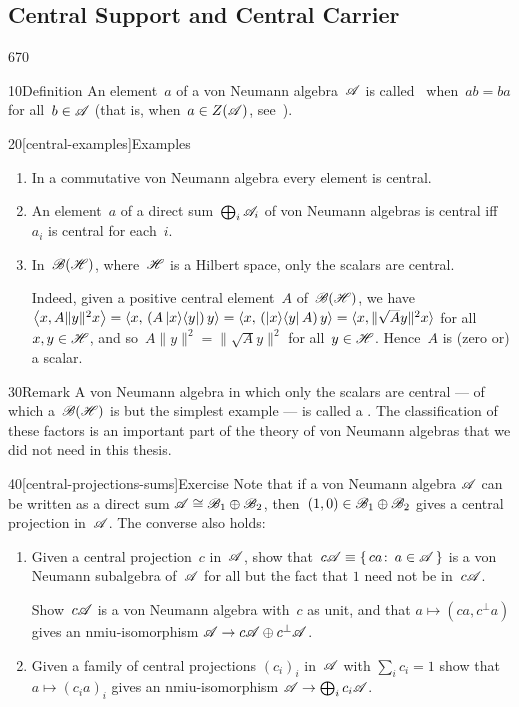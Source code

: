 \subsection{Central Support and Central Carrier}
\begin{parsec}{670}%
\begin{point}{10}{Definition}%
An element~$a$ of a von Neumann algebra~$\mathscr{A}$
is called~%
when~$ab=ba$ for all~$b\in\mathscr{A}$
(that is, when~$a\in Z(\mathscr{A})$, see~).
\end{point}
\begin{point}{20}[central-examples]{Examples}%
\begin{enumerate}
\item
In a commutative von Neumann algebra
every element is central.
\item
An element~$a$ of a direct sum~$\bigoplus_i \mathscr{A}_i$
of von Neumann algebras
is central iff~$a_i$ is central for each~$i$.
\item
In~$\mathscr{B}(\mathscr{H})$,
where~$\mathscr{H}$ is a Hilbert space,
only the scalars are central.

Indeed,
given a positive central element~$A$ 
of~$\mathscr{B}(\mathscr{H})$,
we have $\left<x, A\|y\|^2 x\right>
        = \left<x,\,(A \left|x\right>\!\left<y\right|)\, y\right>
        = \left<x,\,(\left|x\right>\!\left<y\right|A)\, y\right>
= \left<x,\smash{\|\sqrt{A}y\|^2 }x\right>$
for all~$x,y\in\mathscr{H}$,
and so~$A\|y\|^2= \|\sqrt{A}y\|^2$
for all~$y\in\mathscr{H}$.
Hence~$A$ is (zero or) a scalar.
\end{enumerate}
\spacingfix%
\end{point}%
\begin{point}{30}{Remark}%
A von Neumann algebra
in which only the scalars are central
--- of which a~$\mathscr{B}(\mathscr{H})$ is but the simplest example ---
	is called a .
The classification of these factors
is an important part
of the theory of von Neumann algebras
that we did not need in this thesis.
\end{point}
\begin{point}{40}[central-projections-sums]{Exercise}%
Note that if a von Neumann algebra
$\mathscr{A}$ can be written as
a direct sum $\mathscr{A}\cong \mathscr{B}_1\oplus \mathscr{B}_2$,
then~$(1,0)\in\mathscr{B}_1\oplus\mathscr{B}_2$ gives
a central projection in~$\mathscr{A}$.
The converse also holds:
\begin{enumerate}
\item
Given a central projection~$c$ in~$\mathscr{A}$,
show that~$c\mathscr{A} \equiv \{\,ca\colon\, a\in\mathscr{A}\,\}$ 
is a von Neumann subalgebra of~$\mathscr{A}$
for all but the fact that $1$ need not be in~$c\mathscr{A}$.

Show~$c\mathscr{A}$
is a von Neumann algebra with~$c$ as unit,
and that $a\mapsto (ca,c^\perp a)$
gives an nmiu-isomorphism
$\mathscr{A}\to c\mathscr{A}\oplus c^\perp \mathscr{A}$.
\item
Given a family of central projections $(c_i)_i$ in~$\mathscr{A}$
with $\sum_i c_i=1$
show that $a\mapsto (c_ia)_i$
gives an nmiu-isomorphism $\mathscr{A}\to\bigoplus_i c_i \mathscr{A}$.
\end{enumerate}
\spacingfix%
\end{point}%
\end{parsec}%
